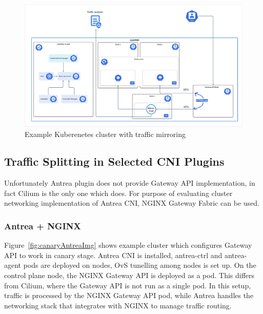 \begin{figure}[H]
    \centering
    \includegraphics[width=1\columnwidth]{images/ingress.png}
    \caption{Example Kuberenetes cluster with traffic mirroring}
    \label{fig:mirroringImg}
\end{figure}


\subsection{Traffic Splitting in Selected CNI Plugins}
\label{subsection:trafficSplitting}

Unfortunately Antrea plugin does not provide Gateway API implementation, in fact Cilium is the only one which does. For purpose of evaluating cluster networking implementation of Antrea CNI, NGINX Gateway Fabric can be used.



\subsubsection{Antrea + NGINX}
\label{subsection:antreaIngress}

Figure~\ref{fig:canaryAntreaImg} shows example cluster which configures Gateway API to work in canary stage. Antrea CNI is installed, antrea-ctrl and antrea-agent pods are deployed on nodes, OvS tunelling among nodes is set up. On the control plane node, the NGINX Gateway API is deployed as a pod. This differs from Cilium, where the Gateway API is not run as a single pod. In this setup, traffic is processed by the NGINX Gateway API pod, while Antrea handles the networking stack that integrates with NGINX to manage traffic routing.

